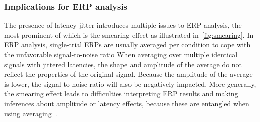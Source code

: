 \subsubsection{Implications for ERP analysis}
The presence of latency jitter introduces multiple issues to ERP analysis, the
most prominent of which is the smearing effect as illustrated
in~\autoref{fig:smearing}. In ERP analysis, single-trial ERPs are usually
averaged per condition to cope with the unfavorable signal-to-noise ratio  When
averaging over multiple identical signals with jittered latencies, the shape and amplitude of the average do not reflect the properties
of the original signal. Because the amplitude of the average is lower, the
signal-to-noise ratio will also be negatively impacted.
More generally, the smearing effect leads to difficulties interpreting ERP
results and making inferences about amplitude or latency effects, because these
are entangled when using averaging~\cite{woody1967characterization, Pfefferbaum1980, McDowell2003, Verleger2005,
	Roth2007, Walhovd2008, Poli2010, Luck2014}.


